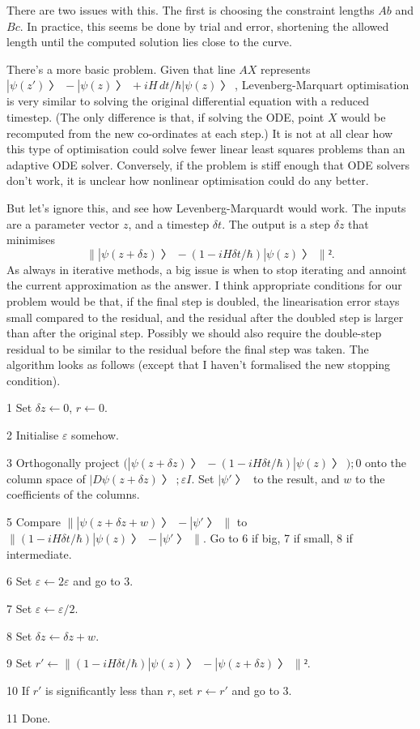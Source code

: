 There are two issues with this.  The first is choosing the constraint lengths $Ab$ and $Bc$.  In practice, this seems be done by trial and error, shortening the allowed length until the computed solution lies close to the curve.

There's a more basic problem.  Given that line $AX$ represents $|ψ(z')〉-|ψ(z)〉+iH\,dt/\hbar|ψ(z)〉$, Levenberg-Marquart optimisation is very similar to solving the original differential equation with a reduced timestep.  (The only difference is that, if solving the ODE, point $X$ would be recomputed from the new co-ordinates at each step.)  It is not at all clear how this type of optimisation could solve fewer linear least squares problems than an adaptive ODE solver.  Conversely, if the problem is stiff enough that ODE solvers don't work, it is unclear how nonlinear optimisation could do any better.

But let's ignore this, and see how Levenberg-Marquardt would work.  The inputs are a parameter vector $z$, and a timestep $δt$.  The output is a step $δz$ that minimises $$\bigl\| |ψ(z+δz)〉-(1-iHδt/\hbar)|ψ(z)〉\bigr\|².$$  As always in iterative methods, a big issue is when to stop iterating and annoint the current approximation as the answer.  I think appropriate conditions for our problem would be that, if the final step is doubled, the linearisation error stays small compared to the residual, and the residual after the doubled step is larger than after the original step.  Possibly we should also require the double-step residual to be similar to the residual before the final step was taken.  The algorithm looks as follows (except that I haven't formalised the new stopping condition).

\item{1} Set $δz←0$, $r←0$.
\item{2} Initialise $ε$ somehow.
\item{3} Orthogonally project $\bigl(|ψ(z+δz)〉-(1-iHδt/\hbar)|ψ(z)〉\bigr); 0$ onto the column space of $|Dψ(z+δz)〉; εI$. Set $|ψ'〉$ to the result, and $w$ to the coefficients of the columns.
\item{5} Compare $\bigl\| |ψ(z+δz+w)〉-|ψ'〉\bigr\|$ to $\bigl\| (1-iHδt/\hbar)|ψ(z)〉-|ψ'〉\bigr\|$.  Go to 6 if big, 7 if small, 8 if intermediate.
\item{6} Set $ε←2ε$ and go to 3.
\item {7} Set $ε←ε/2$.
\item{8} Set $δz←δz+w$.
\item{9} Set $r'←\bigl\| (1-iHδt/\hbar)|ψ(z)〉-|ψ(z+δz)〉\bigr\|²$.
\item{10} If $r'$ is significantly less than $r$, set $r←r'$ and go to 3.
\item{11} Done.

